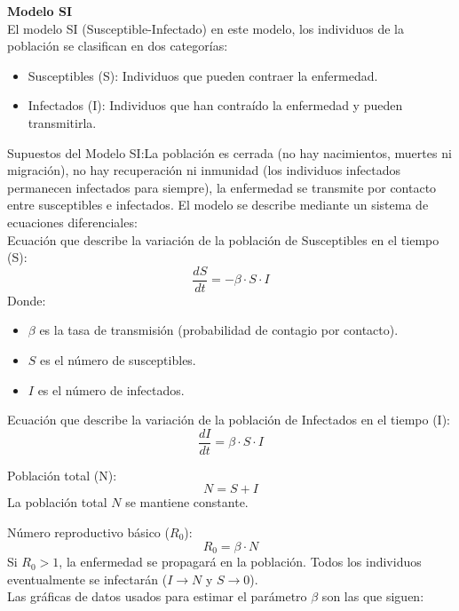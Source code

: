 \textbf{Modelo SI} \\

El modelo SI (Susceptible-Infectado) en este modelo, los individuos de la población se clasifican en dos categorías:
\begin{itemize}
    \item Susceptibles (S): Individuos que pueden contraer la enfermedad.
    \item  Infectados (I): Individuos que han contraído la enfermedad y pueden transmitirla.    
\end{itemize}

Supuestos del Modelo SI:La población es cerrada (no hay nacimientos, muertes ni migración), no hay recuperación ni inmunidad (los individuos infectados permanecen 
infectados para siempre), la enfermedad se transmite por contacto entre susceptibles e infectados. El modelo se describe mediante un sistema de ecuaciones diferenciales: \\

Ecuación que describe la variación de la población de Susceptibles en el tiempo (S): \\
   \[
   \frac{dS}{dt} = -\beta \cdot S \cdot I
   \]
   Donde: \\
   \begin{itemize}
    \item \( \beta \) es la tasa de transmisión (probabilidad de contagio por contacto).
    \item \( S \) es el número de susceptibles.
    \item \( I \) es el número de infectados.
    \end{itemize}

   Ecuación que describe la variación de la población de Infectados en el tiempo (I):\\
   \[
   \frac{dI}{dt} = \beta \cdot S \cdot I
   \]

Población total (N): \\
   \[
   N = S + I
   \]
   La población total \( N \) se mantiene constante.

Número reproductivo básico (\( R_0 \)):
   \[
   R_0 = \beta \cdot N
   \]
   Si \( R_0 > 1 \), la enfermedad se propagará en la población. Todos los individuos eventualmente se infectarán (\( I \to N \) y \( S \to 0 \)). \\

   Las gráficas de datos usados para estimar el parámetro $\beta$ son las que siguen:



